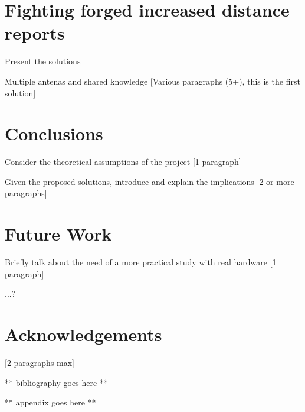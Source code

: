 \documentclass{article}
\begin{document}
\section{Fighting forged increased distance reports}

Present the solutions

Multiple antenas and shared knowledge [Various paragraphs (5+), this is the first solution]

\section{Conclusions}

Consider the theoretical assumptions of the project [1 paragraph]

Given the proposed solutions, introduce and explain the implications [2 or more paragraphs]

\section{Future Work}

Briefly talk about the need of a more practical study with real hardware [1 paragraph]

...?

\section{Acknowledgements}

[2 paragraphs max]

\printbibliography

** bibliography goes here **

** appendix goes here **

\end{document}
